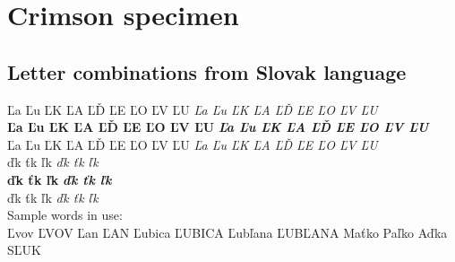 ﻿\documentclass[12pt,a4paper,twoside]{article}
\begin{document}
\section{Crimson specimen}
\subsection{Letter combinations from Slovak language}
\noindent Ľa Ľu ĽK ĽA ĽĎ ĽE ĽO ĽV ĽU \textit{Ľa Ľu ĽK ĽA ĽĎ ĽE ĽO ĽV ĽU}\\
\textbf{Ľa Ľu ĽK ĽA ĽĎ ĽE ĽO ĽV ĽU} \textit{\textbf{Ľa Ľu ĽK ĽA ĽĎ ĽE ĽO ĽV ĽU}}\\
{\crimsonbold Ľa Ľu ĽK ĽA ĽĎ ĽE ĽO ĽV ĽU} {\crimsonbold\textit{Ľa Ľu ĽK ĽA ĽĎ ĽE ĽO ĽV ĽU}}
\\
\noindent ďk ťk ľk \textit{ďk ťk ľk}\\
\textbf{ďk ťk ľk} \textit{\textbf{ďk ťk ľk}}\\
{\crimsonbold ďk ťk ľk} {\crimsonbold\textit{ďk ťk ľk}}
\medskip\\
Sample words in use:\\
Ľvov ĽVOV Ľan ĽAN Ľubica ĽUBICA Ľubľana ĽUBĽANA Maťko Paľko Aďka SĽUK
\end{document}
